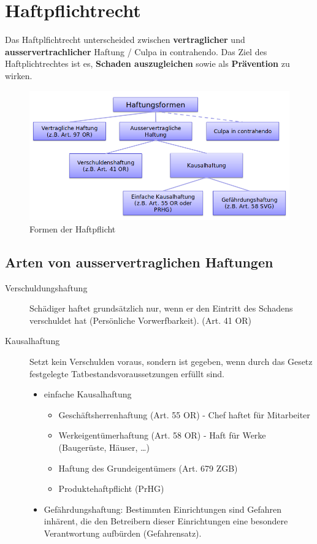 \section{Haftpflichtrecht}

Das Haftplfichtrecht unterscheided zwischen \textbf{vertraglicher} und
\textbf{ausservertrachlicher} Haftung / Culpa in contrahendo. Das Ziel des
Haftplichtrechtes ist es, \textbf{Schaden auszugleichen} sowie als
\textbf{Prävention} zu wirken.

\begin{figure}[H]
	\centering
	\includegraphics[width=.8\textwidth]{figures/haftpflichtrechtFormen.png}
	\caption{Formen der Haftpflicht}
\end{figure}


\subsection{Arten von ausservertraglichen Haftungen}
\label{sec:Haftpflicht-Arten}

\begin{description}
	\item[Verschuldungshaftung] Schädiger haftet grundsätzlich nur, wenn
	er den Eintritt des Schadens verschuldet hat (Persönliche
	Vorwerfbarkeit). (Art. 41 OR)
	\item[Kausalhaftung] Setzt kein Verschulden voraus, sondern ist
	gegeben, wenn durch das Gesetz festgelegte Tatbestandsvoraussetzungen
	erfüllt sind.
	\begin{itemize}
		\tightlist
		\item einfache Kausalhaftung
		\begin{itemize}
			\tightlist
			\item Geschäftsherrenhaftung (Art. 55 OR) - Chef haftet für Mitarbeiter
			\item Werkeigentümerhaftung (Art. 58 OR) - Haft für Werke (Baugerüste,
			Häuser, \ldots{})
			\item Haftung des Grundeigentümers (Art. 679 ZGB)
			\item Produktehaftpflicht (PrHG)
		\end{itemize}
		\item Gefährdungshaftung: Bestimmten Einrichtungen sind Gefahren inhärent,
		die den Betreibern dieser Einrichtungen eine besondere Verantwortung
		aufbürden (Gefahrensatz).
	\end{itemize}
\end{description}


